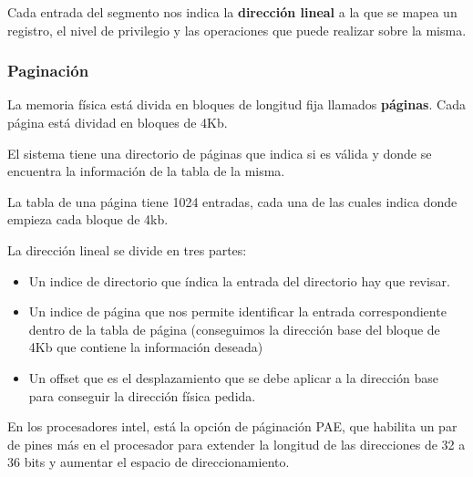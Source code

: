Cada entrada del segmento nos indica la \textbf{dirección lineal} a la que se mapea un registro, el nivel de privilegio y las operaciones que puede realizar sobre la misma.

\subsubsection{Paginación}
La memoria física está divida en bloques de longitud fija llamados \textbf{páginas}. Cada página está dividad en bloques de 4Kb.

El sistema tiene una directorio de páginas que indica si es válida y donde se encuentra la información de la tabla de la misma.

La tabla de una página tiene 1024 entradas, cada una de las cuales indica donde empieza cada bloque de 4kb.

La dirección lineal se divide en tres partes: 
\begin{itemize}
	\item Un indice de directorio que índica la entrada del directorio hay que revisar.
	\item Un indice de página que nos permite identificar la entrada correspondiente dentro de la tabla de página (conseguimos la dirección base del bloque de 4Kb que contiene la información deseada)
	\item Un offset que es el desplazamiento que se debe aplicar a la dirección base para conseguir la dirección física pedida.
\end{itemize}

En los procesadores intel, está la opción de páginación PAE, que habilita un par de pines más en el procesador para extender la longitud de las direcciones de 32 a 36 bits y aumentar el espacio de direccionamiento.

